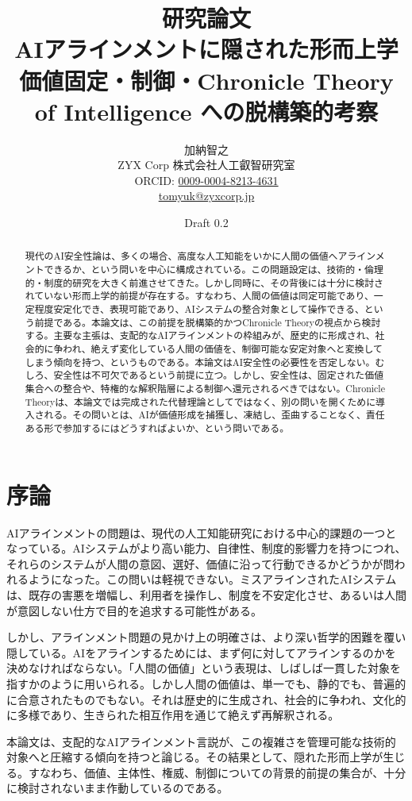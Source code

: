 \documentclass[11pt,a4paper]{ltjsarticle}
\title{\textbf{研究論文}\\[0.75em]AIアラインメントに隠された形而上学\\\large 価値固定・制御・Chronicle Theory of Intelligence への脱構築的考察}
\author{加納智之\\ZYX Corp 株式会社人工叡智研究室\\ORCID: \href{https://orcid.org/0009-0004-8213-4631}{0009-0004-8213-4631}\\\href{mailto:tomyuk@zyxcorp.jp}{tomyuk@zyxcorp.jp}}
\date{Draft 0.2}
\begin{document}
\maketitle

\begin{abstract}
現代のAI安全性論は、多くの場合、高度な人工知能をいかに人間の価値へアラインメントできるか、という問いを中心に構成されている。この問題設定は、技術的・倫理的・制度的研究を大きく前進させてきた。しかし同時に、その背後には十分に検討されていない形而上学的前提が存在する。すなわち、人間の価値は同定可能であり、一定程度安定化でき、表現可能であり、AIシステムの整合対象として操作できる、という前提である。本論文は、この前提を脱構築的かつChronicle Theoryの視点から検討する。主要な主張は、支配的なAIアラインメントの枠組みが、歴史的に形成され、社会的に争われ、絶えず変化している人間の価値を、制御可能な安定対象へと変換してしまう傾向を持つ、というものである。本論文はAI安全性の必要性を否定しない。むしろ、安全性は不可欠であるという前提に立つ。しかし、安全性は、固定された価値集合への整合や、特権的な解釈階層による制御へ還元されるべきではない。Chronicle Theoryは、本論文では完成された代替理論としてではなく、別の問いを開くために導入される。その問いとは、AIが価値形成を捕獲し、凍結し、歪曲することなく、責任ある形で参加するにはどうすればよいか、という問いである。
\end{abstract}

\section{序論}

AIアラインメントの問題は、現代の人工知能研究における中心的課題の一つとなっている。AIシステムがより高い能力、自律性、制度的影響力を持つにつれ、それらのシステムが人間の意図、選好、価値に沿って行動できるかどうかが問われるようになった。この問いは軽視できない。ミスアラインされたAIシステムは、既存の害悪を増幅し、利用者を操作し、制度を不安定化させ、あるいは人間が意図しない仕方で目的を追求する可能性がある。

しかし、アラインメント問題の見かけ上の明確さは、より深い哲学的困難を覆い隠している。AIをアラインするためには、まず何に対してアラインするのかを決めなければならない。「人間の価値」という表現は、しばしば一貫した対象を指すかのように用いられる。しかし人間の価値は、単一でも、静的でも、普遍的に合意されたものでもない。それは歴史的に生成され、社会的に争われ、文化的に多様であり、生きられた相互作用を通じて絶えず再解釈される。

本論文は、支配的なAIアラインメント言説が、この複雑さを管理可能な技術的対象へと圧縮する傾向を持つと論じる。その結果として、隠れた形而上学が生じる。すなわち、価値、主体性、権威、制御についての背景的前提の集合が、十分に検討されないまま作動しているのである。
\end{document}
